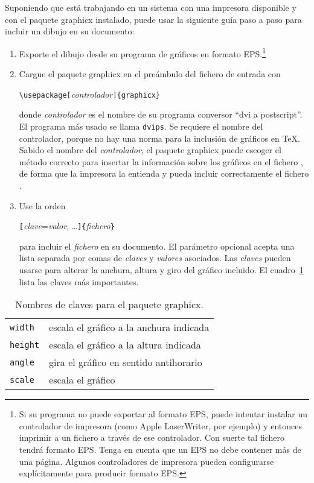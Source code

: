 Suponiendo que está trabajando en un sistema con una impresora
\PSi{} disponible y con el paquete \textsf{graphicx} instalado, puede
usar la siguiente guía paso a paso para incluir un dibujo en su documento:

\begin{enumerate}
\item Exporte el dibujo desde su programa de gráficos en formato
    EPS.\footnote{Si su programa no puede exportar al formato EPS,
    puede intentar instalar un controlador de impresora \PSi{} (como Apple
    LaserWriter, por ejemplo) y entonces imprimir a un fichero a
    través de ese controlador.  Con suerte tal fichero tendrá formato
    EPS.  Tenga en cuenta que un EPS no debe contener más de una
    página.  Algunos controladores de impresora pueden configurarse
    explícitamente para producir formato EPS.}
\item Cargue el paquete \textsf{graphicx} en el preámbulo del fichero
  de entrada con
\begin{lscommand}
\verb|\usepackage[|\emph{controlador}\verb|]{graphicx}|
\end{lscommand}
\noindent donde \emph{controlador} es el nombre de su programa
conversor ``dvi a postscript''.  El programa más usado se llama
\texttt{dvips}.  Se requiere el nombre del controlador, porque no hay
una norma para la inclusión de gráficos en
\TeX{}.  Sabido el nombre del \emph{controlador}, el paquete
\textsf{graphicx} puede escoger el método correcto para insertar la
información sobre los gráficos en el fichero , de forma que
la impresora la entienda y pueda incluir correctamente el fichero .
\item Use la orden
\begin{lscommand}
\verb|[|\emph{clave}=\emph{valor}, \ldots\verb|]{|\emph{fichero}\verb|}|
\end{lscommand}
\noindent para incluir el \emph{fichero} en su documento.  El
parámetro opcional acepta una lista separada por comas de
\emph{claves} y 
\emph{valores} asociados.  Las \emph{claves} pueden usarse para
alterar la anchura, altura y giro del gráfico incluido.  El
cuadro~\ref{keyvals} lista las claves más importantes.
\end{enumerate}

\begin{table}[htb]
\caption{Nombres de claves para el paquete \textsf{graphicx}.}
\label{keyvals}
\begin{lined}{9cm}
\begin{tabular}{@{}ll}
\texttt{width}& escala el gráfico a la anchura indicada\\
\texttt{height}& escala el gráfico a la altura indicada\\
\texttt{angle}& gira el gráfico en sentido antihorario\\
\texttt{scale}& escala el gráfico \\
\end{tabular}

\bigskip
\end{lined}
\end{table}

